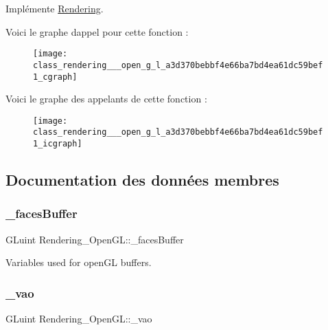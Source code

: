 Implémente \hyperlink{class_rendering_a09a77bbedf75aff7535c419b6f8e4915}{Rendering}.

Voici le graphe d\textquotesingle{}appel pour cette fonction \+:\nopagebreak
\begin{figure}[H]
\begin{center}
\leavevmode
\texttt{[image: class\_rendering\_\_\_open\_g\_l\_a3d370bebbf4e66ba7bd4ea61dc59bef1\_cgraph]}
\end{center}
\end{figure}
Voici le graphe des appelants de cette fonction \+:\nopagebreak
\begin{figure}[H]
\begin{center}
\leavevmode
\texttt{[image: class\_rendering\_\_\_open\_g\_l\_a3d370bebbf4e66ba7bd4ea61dc59bef1\_icgraph]}
\end{center}
\end{figure}


\subsection{Documentation des données membres}
\mbox{\label{class_rendering___open_g_l_a6838049f26cc1811531f2e266f61c158}} 
\subsubsection{\texorpdfstring{\+\_\+faces\+Buffer}{\_facesBuffer}}
{\footnotesize\ttfamily G\+Luint Rendering\+\_\+\+Open\+G\+L\+::\+\_\+faces\+Buffer\hspace{0.3cm}{\ttfamily [private]}}



Variables used for open\+GL buffers. 

\mbox{\label{class_rendering___open_g_l_a4397283457770370db833b1c59db797e}} 
\subsubsection{\texorpdfstring{\+\_\+vao}{\_vao}}
{\footnotesize\ttfamily G\+Luint Rendering\+\_\+\+Open\+G\+L\+::\+\_\+vao\hspace{0.3cm}{\ttfamily [private]}}

